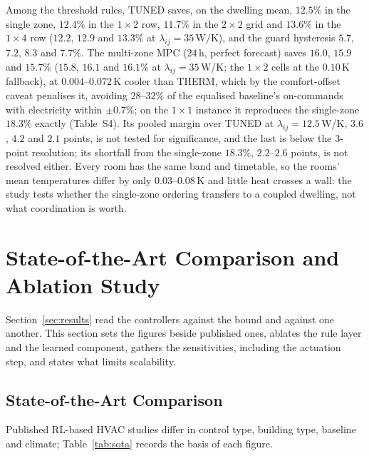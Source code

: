 \documentclass[pdflatex,sn-mathphys-num,iicol]{sn-jnl}
\theoremstyle{thmstyleone}\newtheorem{proposition}{Proposition}\newtheorem{corollary}{Corollary}
\theoremstyle{thmstyletwo}\newtheorem{remark}{Remark}\newtheorem{observation}{Observation}
\theoremstyle{thmstylethree}\newtheorem{definition}{Definition}
\newcommand{\lij}{\lambda_{ij}}
\begin{document}
Among the threshold rules, TUNED saves, on the dwelling mean, $12.5\%$ in the single zone, $12.4\%$ in the $1\times2$ row, $11.7\%$ in the $2\times2$ grid and $13.6\%$ in the $1\times4$ row ($12.2$, $12.9$ and $13.3\%$ at $\lij=35\,$W/K), and the guard hysteresis $5.7$, $7.2$, $8.3$ and $7.7\%$. The multi-zone MPC ($24\,$h, perfect forecast) saves $16.0$, $15.9$ and $15.7\%$ ($15.8$, $16.1$ and $16.1\%$ at $\lij=35\,$W/K; the $1\times2$ cells at the $0.10\,$K fallback), at $0.004$--$0.072\,$K cooler than THERM, which by the comfort-offset caveat penalises it, avoiding $28$--$32\%$ of the equalised baseline's on-commands with electricity within $\pm0.7\%$; on the $1\times1$ instance it reproduces the single-zone $18.3\%$ exactly (Table~S4). Its pooled margin over TUNED at $\lij=12.5\,$W/K, $3.6$, $4.2$ and $2.1$ points, is not tested for significance, and the last is below the $3$-point resolution; its shortfall from the single-zone $18.3\%$, $2.2$--$2.6$ points, is not resolved either. Every room has the same band and timetable, so the rooms' mean temperatures differ by only $0.03$--$0.08\,$K and little heat crosses a wall: the study tests whether the single-zone ordering transfers to a coupled dwelling, not what coordination is worth.

\section{State-of-the-Art Comparison and Ablation Study}
\label{sec:analysis}

Section~\ref{sec:results} read the controllers against the bound and against one another. This section sets the figures beside published ones, ablates the rule layer and the learned component, gathers the sensitivities, including the actuation step, and states what limits scalability.

\subsection{State-of-the-Art Comparison}
\label{subsec:sota}

Published RL-based HVAC studies differ in control type, building type, baseline and climate; Table~\ref{tab:sota} records the basis of each figure.
\end{document}
